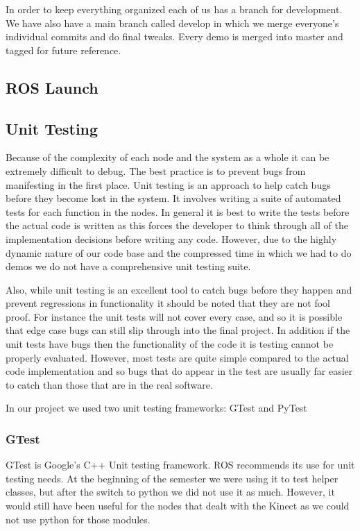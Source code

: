 In order to keep everything organized each of us has a branch for
development.  We have also have a main branch called develop in which
we merge everyone's individual commits and do final tweaks. Every
demo is merged into master and tagged for future reference.

\subsection{ROS Launch}



\subsection{Unit Testing}

Because of the complexity of each node and the system as a whole it can be extremely difficult to debug. The best practice is to prevent bugs from manifesting in the first place. Unit testing is an approach to help catch bugs before they become lost in the system. It involves writing a suite of automated tests for each function in the nodes. In general it is best to write the tests before the actual code is written as this forces the developer to think through all of the implementation decisions before writing any code. However, due to the highly dynamic nature of our code base and the compressed time in which we had to do demos we do not have a comprehensive unit testing suite.

Also, while unit testing is an excellent tool to catch bugs before they happen and prevent regressions in functionality it should be noted that they are not fool proof.  For instance the unit tests will not cover every case, and so it is possible that edge case bugs can still slip through into the final project. In addition if the unit tests have bugs then the functionality of the code it is testing cannot be properly evaluated. However, most tests are quite simple compared to the actual code implementation and so bugs that do appear in the test are usually far easier to catch than those that are in the real software.

In our project we used two unit testing frameworks: GTest and PyTest

\subsubsection{GTest}

GTest is Google's C++ Unit testing
framework.\cite{google_googletest} ROS recommends
its use for unit testing needs. At the beginning of the semester we were using it to test 
helper classes, but after the switch to python we did not use it as much. However, it would still have been useful for the nodes that dealt with the Kinect as we could not use python for those modules.

